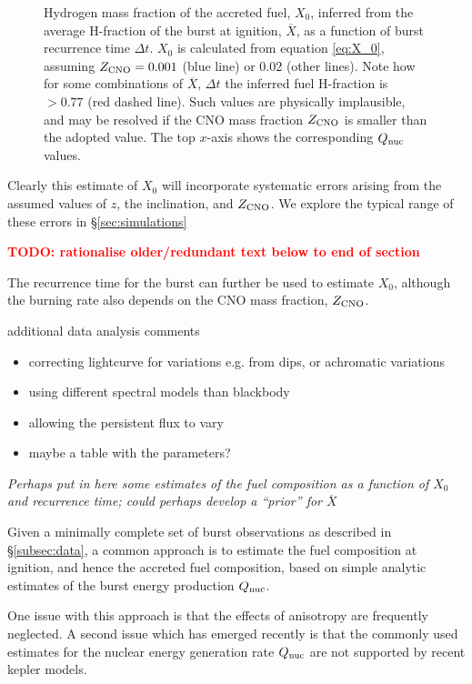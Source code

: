 \documentclass{aastex63}
\newcommand{\Xb}{\ensuremath{\overline{X}}}
\newcommand{\qnuc}{Q_{\rm nuc}}
\newcommand{\zcno}{Z_{\rm CNO}}
\newcommand{\todo}[1]{\textbf{\textcolor{red}{TODO: #1}}} %
\begin{document}
\begin{figure}[ht!]
\caption{Hydrogen mass fraction of the accreted fuel, $X_0$, inferred from the average H-fraction of the burst at ignition, $\overline{X}$, as a function of burst recurrence time $\Delta t$. $X_0$ is calculated from equation \ref{eq:X_0}, assuming $\zcno=0.001$ (blue line) or 0.02 (other lines).
%
Note how for some combinations of $\overline{X}$, $\Delta t$ the inferred fuel H-fraction is $>0.77$ (red dashed line). Such values are physically implausible, and may be resolved if the CNO mass fraction $\zcno$ is smaller than the adopted value.
% 
The top $x$-axis shows the corresponding $\qnuc$ values.
\label{fig:xbar}}
\end{figure}

Clearly this estimate of $X_0$ will incorporate systematic errors arising from the assumed values of $z$, the inclination, and $Z_{\rm CNO}$. We explore the typical range of these errors in 
\S\ref{sec:simulations}

\todo{rationalise older/redundant text below to end of section}

The recurrence time for the burst can further be used to estimate $X_0$, although the burning rate also depends on the CNO mass fraction, $Z_{\rm CNO}$.

additional data analysis comments
\begin{itemize}
\item correcting lightcurve for variations e.g. from dips, or achromatic variations
\item using different spectral models than blackbody
\item allowing the persistent flux to vary
\item maybe a table with the parameters?
\end{itemize}

{\it Perhaps put in here some estimates of the fuel composition as a function of $X_0$ and recurrence time; could perhaps develop a ``prior'' for $\Xb$ }


Given a minimally complete set of burst observations as described in \S\ref{subsec:data}, a common approach \cite[e.g][]{falanga11} is to estimate the fuel composition at ignition, and hence the accreted fuel composition, based on simple analytic estimates of the burst energy production $Q_{\rm nuc}$.

One issue with this approach 
is that the effects of anisotropy are frequently neglected.
%
A second issue which has emerged recently is that the commonly used estimates for the nuclear energy generation rate $Q_{\rm nuc}$ are not supported by recent {\sc kepler} models. 
\end{document}
